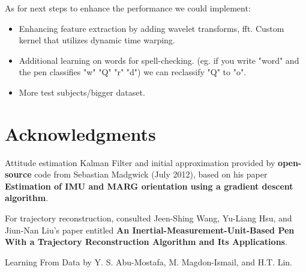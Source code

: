 \documentclass{article}
\begin{document}
As for next steps to enhance the performance we could implement:
\begin{itemize}
  \item Enhancing feature extraction by adding wavelet transforms, fft. Custom kernel that utilizes dynamic time warping. 
  \item Additional learning on words for spell-checking. (eg. if you write "word" and the pen classifies "w" "Q" "r" "d") we can reclassify "Q" to "o". 
  \item More test subjects/bigger dataset. 
\end{itemize}

\section*{Acknowledgments} 
 
Attitude estimation Kalman Filter and initial approximation provided by \textbf{open-source} code from Sebastian Madgwick (July 2012), based on his paper \textbf{Estimation of IMU and MARG orientation using a gradient descent algorithm}.

For trajectory reconstruction, consulted Jeen-Shing Wang, Yu-Liang Hsu, and Jiun-Nan Liu's paper entitled \textbf{An Inertial-Measurement-Unit-Based Pen With a Trajectory Reconstruction Algorithm and Its Applications}. 

Learning From Data by Y. S. Abu-Mostafa, M. Magdon-Ismail, and H.T. Lin.
%
%
\end{document}
